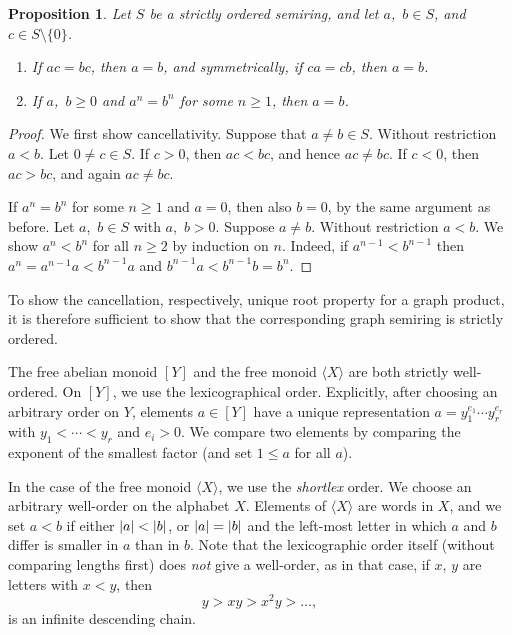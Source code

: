 \documentclass{amsart}
\theoremstyle{plain}
\newtheorem{proposition}[thm]{Proposition}
\theoremstyle{definition}
\DeclarePairedDelimiter{\card}{\lvert}{\rvert}
\DeclarePairedDelimiter{\length}{\lvert}{\rvert}
\begin{document}
\begin{proposition} \label{p:semiring-unique}
  Let $S$ be a strictly ordered semiring, and let $a$,~$b \in S$, and $c \in S \setminus \{0\}$.
  \begin{enumerate}
    \item If $ac=bc$, then $a=b$, and symmetrically, if $ca=cb$, then $a=b$.
    \item If $a$,~$b \ge 0$ and $a^n = b^n$ for some $n \ge 1$, then $a = b$.
  \end{enumerate}
\end{proposition}

\begin{proof}
  We first show cancellativity.
  Suppose that $a \ne b \in S$.
  Without restriction $a < b$.
  Let $0 \ne c \in S$.
  If $c > 0$, then $ac < bc$, and hence $ac \ne bc$.
  If $c < 0$, then $ac > bc$, and again $ac \ne bc$.

  If $a^n=b^n$ for some $n \ge 1$ and $a=0$, then also $b=0$, by the same argument as before.
  Let $a$,~$b \in S$ with $a$,~$b > 0$.
  Suppose $a \ne b$.
  Without restriction $a < b$.
  We show $a^n < b^n$ for all $n \ge 2$ by induction on $n$.
  Indeed, if $a^{n-1} < b^{n-1}$ then $a^n=a^{n-1}a < b^{n-1}a$ and $b^{n-1}a < b^{n-1}b=b^n$.
\end{proof}

To show the cancellation, respectively, unique root property for a graph product, it is therefore sufficient to show that the corresponding graph semiring is strictly ordered.

The free abelian monoid $[Y]$ and the free monoid $\langle X \rangle$ are both strictly well-ordered.
On $[Y]$, we use the lexicographical order.
Explicitly, after choosing an arbitrary order on $Y$, elements $a \in [Y]$ have a unique representation $a=y_1^{e_1} \cdots y_r^{e_r}$ with $y_1 < \cdots < y_r$ and $e_i > 0$.
We compare two elements by comparing the exponent of the smallest factor (and set $1 \le a$ for all $a$).

In the case of the free monoid $\langle X \rangle$, we use the \emph{shortlex} order.
We choose an arbitrary well-order on the alphabet $X$.
Elements of $\langle X \rangle$ are words in $X$, and we set $a < b$ if either $\length{a} < \length{b}$, or $\card{a} = \card{b}$ and the left-most letter in which $a$ and $b$ differ is smaller in $a$ than in $b$.
Note that the lexicographic order itself (without comparing lengths first) does \emph{not} give a well-order, as in that case, if $x$, $y$ are letters with $x < y$, then
\[
  y > xy > x^2y > \dots,
\]
is an infinite descending chain.
\end{document}
